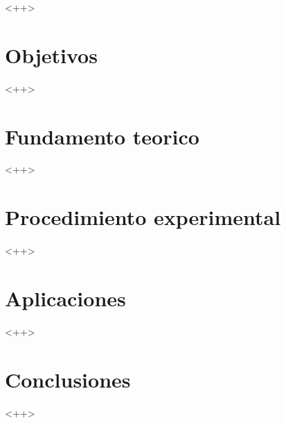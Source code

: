 \documentclass[11pt,conference,onecolumn,a4paper]{IEEEtran}
\begin{document}
\maketitle

\begin{abstract}
    <++>
\end{abstract}

\begin{IEEEkeywords}
<++>
\end{IEEEkeywords}

\section{Objetivos}

<++>
\section{Fundamento teorico}

<++>

\section{Procedimiento experimental}

<++>

\section{Aplicaciones}

<++>

\section{Conclusiones}

<++>
\end{document}
